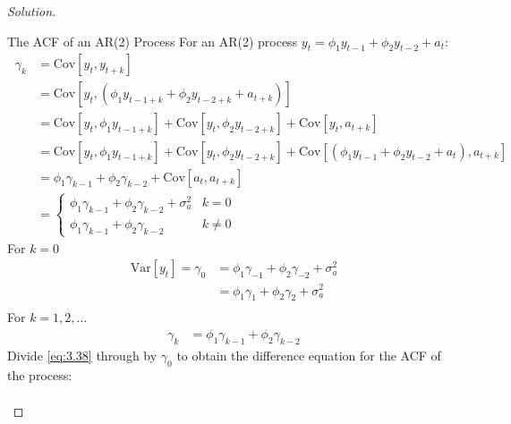 \documentclass[UTF8,a4paper,14pt]{ctexart}
\newcommand{\Var}{\mathrm{Var}}
\newcommand{\Cov}{\mathrm{Cov}}
\newenvironment{solution}
  {\renewcommand\qedsymbol{$\blacksquare$}\begin{proof}[Solution]}
  {\end{proof}}
\theoremstyle{definition}
\theoremstyle{remark}
\begin{document}
\begin{solution}\
  \begin{mybox}{The ACF of an AR(2) Process}
    For an AR(2) process \(y_t  = \phi_1 y_{t-1} +\phi_2 y_{t-2} + a_{t}\):
  \begin{equation}\
    \begin{aligned}
      \gamma_k &= \Cov[y_t,y_{t+k}]\\
      &=\Cov[ y_t, (\phi_1 y_{t-1+k} +\phi_2 y_{t-2+k} + a_{t+k})]\\
      &=\Cov[ y_t, \phi_1 y_{t-1+k}]+\Cov[y_t, \phi_2 y_{t-2+k}] + \Cov[y_t, a_{t+k}]\\
      &=\Cov[ y_t, \phi_1 y_{t-1+k}]+\Cov[y_t, \phi_2 y_{t-2+k}] + \Cov[( \phi_1 y_{t-1} +\phi_2 y_{t-2} + a_{t}), a_{t+k}]\\
      &=\phi_1 \gamma_{k-1}+\phi_2 \gamma_{k-2} + \Cov[a_{t}, a_{t+k}]\\
      & = \begin{cases}
        \phi_1 \gamma_{k-1}+\phi_2 \gamma_{k-2}+\sigma_a^2&k = 0\\
        \phi_1 \gamma_{k-1}+\phi_2 \gamma_{k-2} &k \neq0
      \end{cases}
    \end{aligned}
  \end{equation}
  For \(k = 0\)
  \begin{equation}\
    \begin{aligned}
      \Var[y_t] = \gamma_0 
      &= \phi_1 \gamma_{-1}+\phi_2 \gamma_{-2}+\sigma_a^2 \\
      &= \phi_1 \gamma_{1}+\phi_2 \gamma_{2}+\sigma_a^2\\
    \end{aligned}
  \end{equation}
  For \(k = 1,2,\ldots\)
  \begin{equation}\
    \begin{aligned}\label{eq:3.38}
     \gamma_k &=  \phi_1 \gamma_{k-1}+\phi_2 \gamma_{k-2}
    \end{aligned}
  \end{equation}
Divide \eqref{eq:3.38} through by \(\gamma_0\) to obtain the difference equation for the ACF of the process:
\begin{equation}\
  \begin{aligned}

\end{aligned}
\end{equation}
\end{mybox}
\end{solution}
\end{document}
